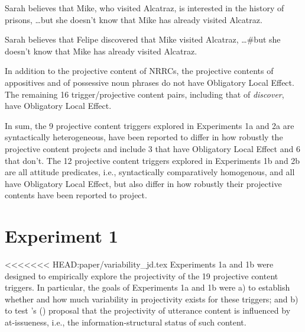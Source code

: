 \documentclass[11pt,fleqn]{article}
\newcommand{\6}{\mbox{$[\hspace*{-.6mm}[$}}
\newcommand{\9}{\mbox{$]\hspace*{-.6mm}]$}}
\newcommand{\citetpos}[1]{\citeauthor{#1}'s (\citeyear{#1})}
\begin{document}
\begin{exe}
\ex\label{ole}
\begin{xlist}
\ex Sarah believes that Mike, who visited Alcatraz, is interested in the history of prisons, \ldots but she doesn't know that Mike has already visited Alcatraz.

\ex Sarah believes that Felipe discovered that Mike visited Alcatraz, \ldots \#but she doesn't know that Mike has already visited Alcatraz. 

\end{xlist}
\end{exe}
In addition to the projective content of NRRCs, the projective contents of appositives and of possessive noun phrases do not have Obligatory Local Effect. The remaining 16 trigger/projective content pairs, including that of {\em discover}, have Obligatory Local Effect. 

In sum, the 9 projective content triggers explored in Experiments 1a and 2a are syntactically heterogeneous, have been reported to differ in how robustly the projective content projects and include 3 that have Obligatory Local Effect and 6 that don't. The 12 projective content triggers explored in Experiments 1b and 2b are all attitude predicates, i.e., syntactically comparatively homogenous, and all have Obligatory Local Effect, but also differ in how robustly their projective contents have been reported to project.


\section{Experiment 1}\label{s3}

<<<<<<< HEAD:paper/variability_jd.tex
Experiments 1a and 1b were designed to empirically explore the projectivity of the 19 projective content triggers. In particular, the goals of Experiments 1a and 1b were a) to establish whether and how much variability in projectivity exists for these triggers; and b) to test \citetpos{brst-salt10} proposal that the projectivity of utterance content is influenced by at-issueness, i.e., the information-structural status of such content. 
\end{document}
